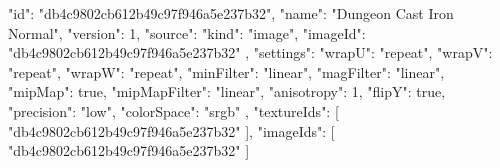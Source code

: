 {
  "id": "db4c9802cb612b49c97f946a5e237b32",
  "name": "Dungeon Cast Iron Normal",
  "version": 1,
  "source": {
    "kind": "image",
    "imageId": "db4c9802cb612b49c97f946a5e237b32"
  },
  "settings": {
    "wrapU": "repeat",
    "wrapV": "repeat",
    "wrapW": "repeat",
    "minFilter": "linear",
    "magFilter": "linear",
    "mipMap": true,
    "mipMapFilter": "linear",
    "anisotropy": 1,
    "flipY": true,
    "precision": "low",
    "colorSpace": "srgb"
  },
  "textureIds": [
    "db4c9802cb612b49c97f946a5e237b32"
  ],
  "imageIds": [
    "db4c9802cb612b49c97f946a5e237b32"
  ]
}
